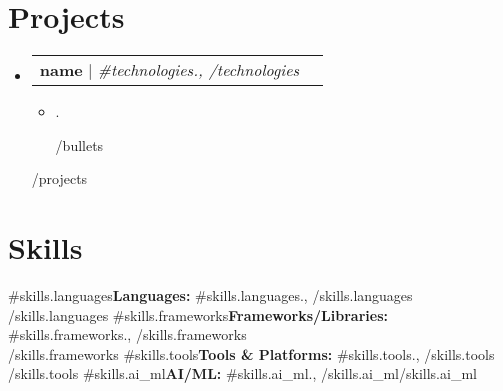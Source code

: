 \documentclass[letterpaper,11pt]{article}
\makeatletter
\newcommand{\resumeItem}[1]{
  \item\small{
    {#1 \vspace{-2pt}}
  }
}
\newcommand{\resumeProjectHeading}[2]{
    \item
    \begin{tabular*}{1.01\textwidth}{l@{\extracolsep{\fill}}r}
      \small#1 & \textbf{\small #2}\\
    \end{tabular*}\vspace{-7pt}
}
\newcommand{\resumeSubHeadingListStart}{\begin{itemize}[leftmargin=0.0in, label={}]}
\newcommand{\resumeSubHeadingListEnd}{\end{itemize}}
\newcommand{\resumeItemListStart}{\begin{itemize}}
\newcommand{\resumeItemListEnd}{\end{itemize}\vspace{-5pt}}
\makeatother
\begin{document}
\section{Projects}
  \resumeSubHeadingListStart
    {{#projects}}
    \resumeProjectHeading
      {\textbf{ {{name}} } $|$ \emph{ {{#technologies}}{{.}}, {{/technologies}} }}{}
      \resumeItemListStart
        {{#bullets}}
        \resumeItem{ {{.}} }
        {{/bullets}}
      \resumeItemListEnd
    {{/projects}}
  \resumeSubHeadingListEnd
\vspace{-10pt}

\section{Skills}
 \begin{itemize}[leftmargin=0.15in, label={}]
    \small{\item{
     {{#skills.languages}}\textbf{Languages:} {{#skills.languages}}{{.}}, {{/skills.languages}} \\ {{/skills.languages}}
     {{#skills.frameworks}}\textbf{Frameworks/Libraries:} {{#skills.frameworks}}{{.}}, {{/skills.frameworks}} \\ {{/skills.frameworks}}
     {{#skills.tools}}\textbf{Tools \& Platforms:} {{#skills.tools}}{{.}}, {{/skills.tools}} \\ {{/skills.tools}}
     {{#skills.ai_ml}}\textbf{AI/ML:} {{#skills.ai_ml}}{{.}}, {{/skills.ai_ml}}{{/skills.ai_ml}}
    }}
 \end{itemize}
\vspace{-16pt}
\end{document}
